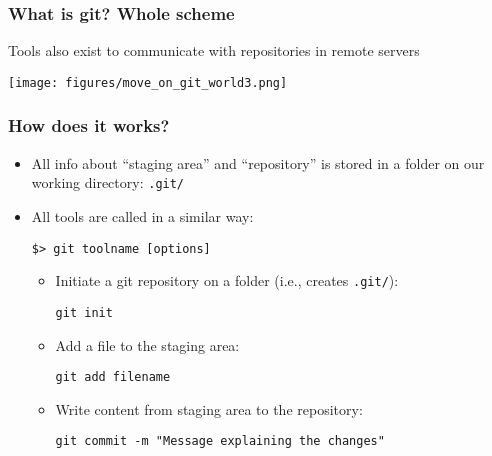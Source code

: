 \documentclass[xcolor=dvipsnames,10pt]{beamer}
\begin{document}
\begin{frame}
 \frametitle{What is git? Whole scheme}
 
 Tools also exist to communicate with repositories in remote servers
  \vspace*{0.4cm}
 
 \begin{center}
 \texttt{[image: figures/move\_on\_git\_world3.png]}
 \end{center}
 
\end{frame}


\begin{frame}
 \frametitle{How does it works?}

\begin{itemize}
 \item All info about ``staging area'' and ``repository'' is stored in a folder on our working directory: {\color{blue}\texttt{.git/}}
 \vspace*{0.3cm}
 
 \item All tools are called in a similar way:
  \vspace*{0.1cm}

  \texttt{\$> {\color{blue}git toolname [options]}}
  \vspace*{0.2cm}
  
  \begin{itemize}
   \item Initiate a git repository on a folder (i.e., creates \texttt{.git/}):
   
   \texttt{git init}
   \vspace*{0.1cm}
   
   \item Add a file to the staging area:
   
   \texttt{git add filename}
   \vspace*{0.1cm}
   
   \item Write content from staging area to the repository:
   
   \texttt{git commit -m "Message explaining the changes"}
  
  \end{itemize}
  
\end{itemize}

\end{frame}
\end{document}
